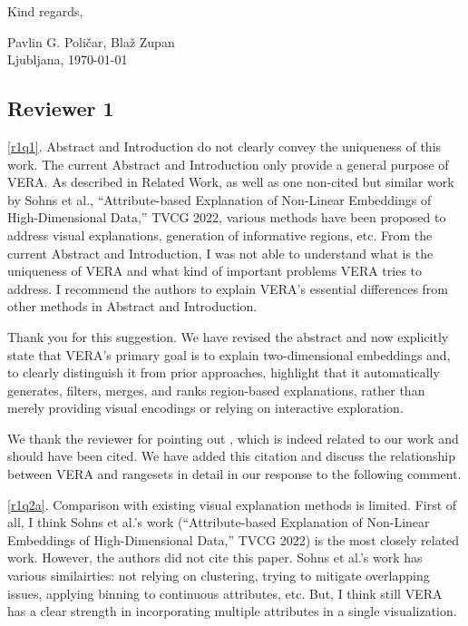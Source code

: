\documentclass[11pt]{article}
\newcounter{rtaskno}
\newcommand{\rtask}[1]{\refstepcounter{rtaskno}\label{#1}}
\newcommand{\reviewc}[2]{\begin{leftbar}\noindent\rtask{#1}\ref{#1}. #2\end{leftbar}\vspace*{-4mm}}
\newcommand{\answer}[1]{\noindent #1\par\vspace{2mm}}
\newlength{\leftbarwidth}
\newlength{\leftbarsep}
\renewenvironment{leftbar}{%
    \def\FrameCommand{{\color{black}{\vrule width \leftbarwidth\relax\hspace {\leftbarsep}}}}%
    \MakeFramed {\advance \hsize -\width \FrameRestore }%
}{\endMakeFramed}
\begin{document}
\noindent Kind regards,
\vspace{3mm}

\noindent Pavlin G. Poli\v{c}ar,
Bla\v{z} Zupan \\ 
\noindent Ljubljana, \today

\newpage

\subsection*{Reviewer 1}

\reviewc{r1q1}{Abstract and Introduction do not clearly convey the uniqueness of this work.
The current Abstract and Introduction only provide a general purpose of VERA. As described in Related Work, as well as one non-cited but similar work by Sohns et al., ``Attribute-based Explanation of Non-Linear Embeddings of High-Dimensional Data,'' TVCG 2022, various methods have been proposed to address visual explanations, generation of informative regions, etc. From the current Abstract and Introduction, I was not able to understand what is the uniqueness of VERA and what kind of important problems VERA tries to address. I recommend the authors to explain VERA's essential differences from other methods in Abstract and Introduction.}

\answer{%
Thank you for this suggestion. We have revised the abstract and now explicitly state that VERA's primary goal is to explain two-dimensional embeddings and, to clearly distinguish it from prior approaches, highlight that it automatically generates, filters, merges, and ranks region-based explanations, rather than merely providing visual encodings or relying on interactive exploration.

We thank the reviewer for pointing out \citet{Sohns2022}, which is indeed related to our work and should have been cited. We have added this citation and discuss the relationship between VERA and rangesets in detail in our response to the following comment.
}


\reviewc{r1q2a}{Comparison with existing visual explanation methods is limited.
First of all, I think Sohns et al.'s work (``Attribute-based Explanation of Non-Linear Embeddings of High-Dimensional Data,'' TVCG 2022) is the most closely related work. However, the authors did not cite this paper. Sohns et al.'s work has various similairties: not relying on clustering, trying to mitigate overlapping issues, applying binning to continuous attributes, etc. But, I think still VERA has a clear strength in incorporating multiple attributes in a single visualization.}
\end{document}
